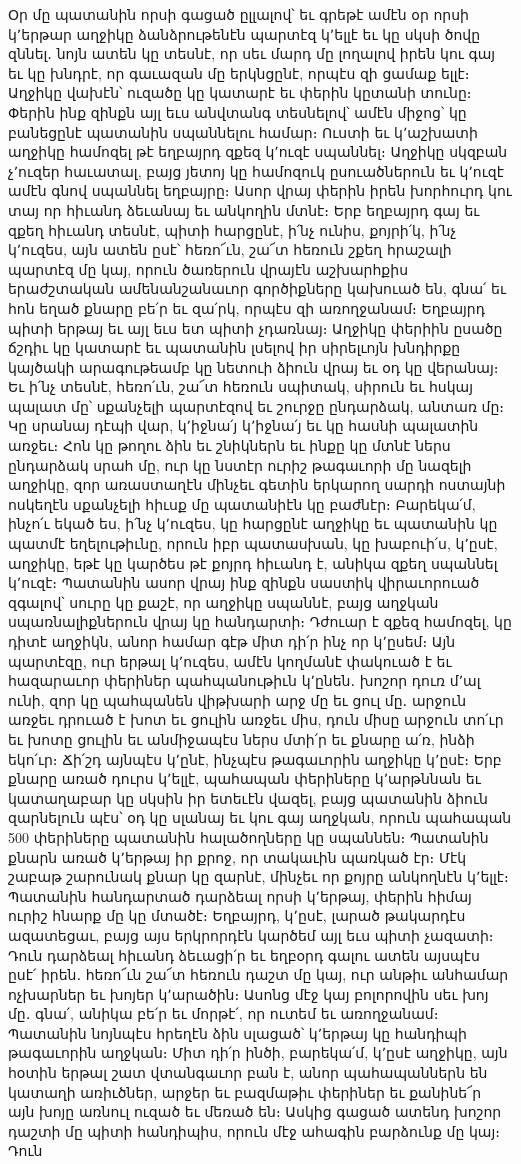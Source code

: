 \documentclass{article}
\begin{document}
{Օր մը պատանին որսի գացած ըլլալով՝ եւ գրեթէ ամէն օր որսի կ՚երթար աղջիկը ձանձրութենէն պարտէզ կ՚ելլէ եւ կը սկսի ծովը զննել․ նոյն ատեն կը տեսնէ, որ սեւ մարդ մը լողալով իրեն կու գայ եւ կը խնդրէ, որ գաւազան մը երկնցընէ, որպէս զի ցամաք ելլէ։ Աղջիկը վախէն՝ ուզածը կը կատարէ եւ փերին կըտանի տունը։ Փերին ինք զինքն այլ եւս անվտանգ տեսնելով՝ ամէն միջոց՝ կը բանեցընէ պատանին սպաննելու համար։ Ուստի եւ կ՚աշխատի աղջիկը համոզել թէ եղբայրդ զքեզ կ՚ուզէ սպաննել։ Աղջիկը սկզբան չ՚ուզեր հաւատալ, բայց յետոյ կը համոզուկ ըսուածներուն եւ կ՚ուզէ ամէն գնով սպաննել եղբայրը։ Ասոր վրայ փերին իրեն խորհուրդ կու տայ որ հիւանդ ձեւանայ եւ անկողին մտնէ։ Երբ եղբայրդ գայ եւ զքեղ հիւանդ տեսնէ, պիտի հարցընէ, ի՛նչ ունիս, քոյրի՛կ, ի՛նչ կ՚ուզես, այն ատեն ըսէ՝ հեռո՜ւն, շա՜տ հեռուն շքեղ հրաշալի պարտէզ մը կայ, որուն ծառերուն վրայէն աշխարհքիս երաժշտական ամենանշանաւոր գործիքները կախուած են, գնա՛ եւ հոն եղած քնարը բե՛ր եւ զա՛րկ, որպէս զի առողջանամ։ Եղբայրդ պիտի երթայ եւ այլ եւս ետ պիտի չդառնայ։ Աղջիկը փերիին ըսածը ճշդիւ կը կատարէ եւ պատանին լսելով իր սիրելւոյն խնդիրքը կայծակի արագութեամբ կը նետուի ձիուն վրայ եւ օդ կը վերանայ։ Եւ ի՛նչ տեսնէ, հեռո՛ւն, շա՜տ հեռուն սպիտակ, սիրուն եւ հսկայ պալատ մը՝ սքանչելի պարտէզով եւ շուրջը ընդարձակ, անտառ մը։ Կը սրանայ դէպի վար, կ՚իջնա՛յ կ՚իջնա՛յ եւ կը հասնի պալատին առջեւ։ Հոն կը թողու ձին եւ շնիկներն եւ ինքը կը մտնէ ներս ընդարձակ սրահ մը, ուր կը նստէր ուրիշ թագաւորի մը նազելի աղջիկը, զոր առաստաղէն մինչեւ գետին երկարող սարդի ոստայնի ոսկեղէն սքանչելի հիւսք մը պատանիէն կը բաժնէր։ Բարեկա՛մ, ինչո՛ւ եկած ես, ի՛նչ կ՚ուզես, կը հարցընէ աղջիկը եւ պատանին կը պատմէ եղելութիւնը, որուն իբր պատասխան, կը խաբուի՛ս, կ՚ըսէ, աղջիկը, եթէ կը կարծես թէ քոյրդ հիւանդ է, անիկա զքեղ սպաննել կ՚ուզէ։ Պատանին ասոր վրայ ինք զինքն սաստիկ վիրաւորուած զգալով՝ սուրը կը քաշէ, որ աղջիկը սպաննէ, բայց աղջկան սպառնալիքներուն վրայ կը հանդարտի։ Դժուար է զքեզ համոզել, կը դիտէ աղջիկն, անոր համար գէթ միտ դի՛ր ինչ որ կ՚ըսեմ։ Այն պարտէզը, ուր երթալ կ՚ուզես, ամէն կողմանէ փակուած է եւ հազարաւոր փերիներ պահպանութիւն կ՚ընեն․ խոշոր դուռ մ՚ալ ունի, զոր կը պահպանեն վիթխարի արջ մը եւ ցուլ մը․ արջուն առջեւ դրուած է խոտ եւ ցուլին առջեւ միս, դուն միսը արջուն տո՛ւր եւ խոտը ցուլին եւ անմիջապէս ներս մտի՛ր եւ քնարը ա՛ռ, ինձի եկո՛ւր։ Ճի՛շդ այնպէս կ՚ընէ, ինչպէս թագաւորին աղջիկը կ՚ըսէ։ Երբ քնարը առած դուրս կ՚ելլէ, պահապան փերիները կ՚արթննան եւ կատաղաբար կը սկսին իր ետեւէն վազել, բայց պատանին ձիուն զարնելուն պէս՝ օդ կը սլանայ եւ կու գայ աղջկան, որուն պահապան 500 փերիները պատանին հալածողները կը սպաննեն։ Պատանին քնարն առած կ՚երթայ իր քրոջ, որ տակաւին պառկած էր։ Մէկ շաբաթ շարունակ քնար կը զարնէ, մինչեւ որ քոյրը անկողնէն կ՚ելլէ։ Պատանին հանդարտած դարձեալ որսի կ՚երթայ, փերին հիմայ ուրիշ հնարք մը կը մտածէ։ Եղբայրդ, կ՚ըսէ, լարած թակարդէս ազատեցաւ, բայց այս երկրորդէն կարծեմ այլ եւս պիտի չազատի։ Դուն դարձեալ հիւանդ ձեւացի՛ր եւ եղբօրդ գալու ատեն այսպէս ըսէ՛ իրեն․ հեռո՜ւն շա՜տ հեռուն դաշտ մը կայ, ուր անթիւ անհամար ոչխարներ եւ խոյեր կ՚արածին։ Ասոնց մէջ կայ բոլորովին սեւ խոյ մը․ գնա՛, անիկա բե՛ր եւ մորթէ՛, որ ուտեմ եւ առողջանամ։ Պատանին նոյնպէս հրեղէն ձին սլացած՝ կ՚երթայ կը հանդիպի թագաւորին աղջկան։ Միտ դի՛ր ինծի, բարեկա՛մ, կ՚ըսէ աղջիկը, այն հօտին երթալ շատ վտանգաւոր բան է, անոր պահապաններն են կատաղի առիւծներ, արջեր եւ բազմաթիւ փերիներ եւ քանինե՜ր այն խոյը առնուլ ուզած եւ մեռած են։ Ասկից գացած ատենդ խոշոր դաշտի մը պիտի հանդիպիս, որուն մէջ ահագին բարձունք մը կայ։ Դուն }
\end{document}
